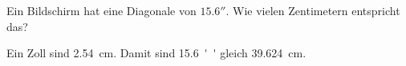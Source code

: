 
\begin{aufgabe}
	Ein Bildschirm hat eine Diagonale von $\num{15.6}''$. Wie vielen Zentimetern entspricht das?
	\begin{loesung}
		Ein Zoll sind \SI{2.54}{cm}. Damit sind \SI{15.6}{''} gleich \SI{39.624}{cm}.
	\end{loesung}
\end{aufgabe}
